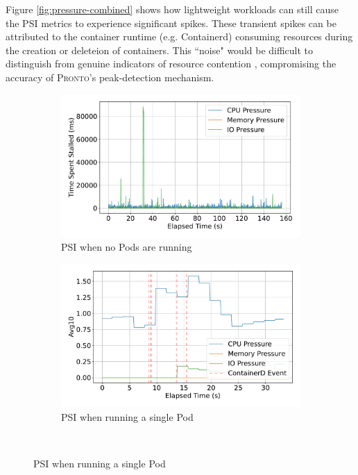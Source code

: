Figure \ref{fig:pressure-combined} shows how lightweight workloads can still cause the
PSI metrics to experience significant spikes. These transient spikes
can be attributed to the container runtime (e.g. Containerd) consuming resources
during the creation or deleteion of containers. This ``noise" would be
difficult to distinguish from genuine indicators of resource contention ,
compromising the accuracy of \textsc{Pronto}'s peak-detection mechanism.

\begin{figure}[htbp] %
    \centering %

    \begin{subfigure}[b]{0.48\textwidth} %
        \centering
        \includegraphics[width=\linewidth]{images/pressure-baseline.pdf}
        \caption{PSI when no Pods are running} %
        \label{fig:avg-pressure-baseline} %
    \end{subfigure}%
    \hfill %
    \begin{subfigure}[b]{0.48\textwidth}
        \centering
        \includegraphics[width=\linewidth]{images/avg-pressure-single.pdf}
        \caption{PSI when running a single Pod} %
        \label{fig:avg-pressure-single}
    \end{subfigure}
    \\[1em] %


\end{figure}
